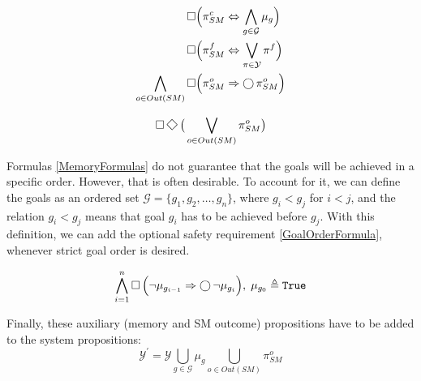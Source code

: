 \begin{subequations}
	\label{SMOutcomeFormulas}
	\begin{align}
		\operatorname{\Box}& \Big( \pi_{SM}^{c} \Leftrightarrow \bigwedge \limits_{g \in \mathcal{G}} \mu_g \Big) \label{SuccessfulOutcomeFormula}\\
		\operatorname{\Box}& \Big( \pi_{SM}^{f} \Leftrightarrow \bigvee \limits_{\pi \in \mathcal{Y}} \pi^f \Big) \label{FailedOutcomeFormula}\\
		\bigwedge \limits_{o \in Out(SM)} \operatorname{\Box}& \Big( \pi_{SM}^{o} \Rightarrow \operatorname{\bigcirc} \pi_{SM}^{o} \Big) \label{SMOutcomePersistenceFormula}
	\end{align}
\end{subequations}

\begin{equation}\label{SuccessLivenessFormula}
	\LTLG \LTLF \big( \bigvee \limits_{o \in Out(SM)} \pi_{SM}^{o} \big)
\end{equation}

Formulas \eqref{MemoryFormulas} do not guarantee that the goals will be achieved in a specific order.
However, that is often desirable. 
To account for it, we can define the goals as an ordered set $\mathcal{G} = \{ g_1, g_2, \ldots, g_n \}$, where $g_i < g_j$ for $i<j$, and the relation $g_i < g_j$ means that goal $g_i$ has to be achieved before $g_j$.
With this definition, we can add the optional safety requirement \eqref{GoalOrderFormula}, whenever strict goal order is desired.

\begin{equation}\label{GoalOrderFormula}
	\bigwedge \limits_{i = 1}^n \operatorname{\Box} \Big(  \lnot \mu_{g_{i-1}} \Rightarrow \operatorname{\bigcirc} \lnot \mu_{g_i} \Big), \; \mu_{g_0} \triangleq \texttt{True}
\end{equation}

Finally, these auxiliary (memory and SM outcome) propositions have to be added to the system propositions: $$\mathcal{Y}^\prime = \mathcal{Y} \bigcup \limits_{g \in \mathcal{G}} \mu_g \bigcup \limits_{o \in Out(SM)} \pi_{SM}^o$$

